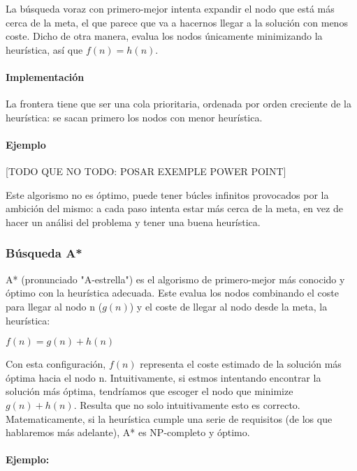 \documentclass[12pt,a4paper,catalan, leqno]{article} %
\theoremstyle{definition}
\begin{document}
La búsqueda voraz con primero-mejor intenta expandir el nodo que está más cerca de la meta, el que parece que va a hacernos llegar a la solución con menos coste. Dicho de otra manera, evalua los nodos únicamente minimizando la heurística, así que $f(n) = h(n)$.

\paragraph{Implementación}

La frontera tiene que ser una cola prioritaria, ordenada por orden creciente de la heurística: se sacan primero los nodos con menor heurística.

\paragraph{Ejemplo}

[TODO QUE NO TODO: POSAR EXEMPLE POWER POINT]

Este algorismo no es óptimo, puede tener búcles infinitos provocados por la ambición del mismo: a cada paso intenta estar más cerca de la meta, en vez de hacer un análisi del problema y tener una buena heurística.

\subsubsection{Búsqueda A*}

A* (pronunciado "A-estrella") es el algorismo de primero-mejor más conocido y óptimo con la heurística adecuada. Este evalua los nodos combinando el coste para llegar al nodo n ($g(n)$) y el coste de llegar al nodo desde la meta, la heurística:

\begin{center}
    $f(n) = g(n) + h(n)$
\end{center}

Con esta configuración, $f(n)$ representa el coste estimado de la solución más óptima hacia el nodo n. Intuitivamente, si estmos intentando encontrar la solución más óptima, tendríamos que escoger el nodo que minimize $g(n) + h(n)$. Resulta que no solo intuitivamente esto es correcto. Matematicamente, si la heurística cumple una serie de requisitos (de los que hablaremos más adelante), A* es NP-completo y óptimo.

\paragraph{Ejemplo:}
\end{document}
